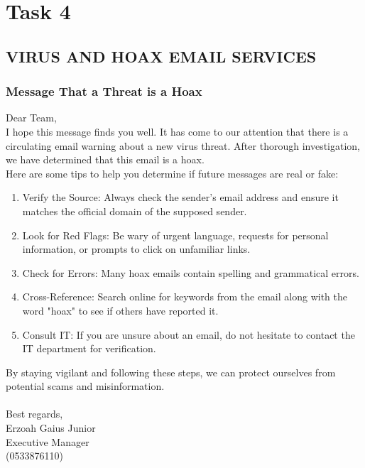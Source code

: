 \chapter*{ \centering Task 4}

\section*{VIRUS AND HOAX EMAIL SERVICES}
\subsection*{Message That a Threat is a Hoax}

Dear Team,\\

I hope this message finds you well. It has come to our attention that there is a circulating email warning about a new virus threat. After thorough investigation, we have determined that this email is a hoax. \\

Here are some tips to help you determine if future messages are real or fake:\vspace{.2cm}
\begin{enumerate}
	\item
	Verify the Source: Always check the sender's email address and ensure it matches the official domain of the supposed sender.
	\item
	Look for Red Flags: Be wary of urgent language, requests for personal information, or prompts to click on unfamiliar links.
	\item
	Check for Errors: Many hoax emails contain spelling and grammatical errors.
	\item
	Cross-Reference: Search online for keywords from the email along with the word "hoax" to see if others have reported it.
	\item
	Consult IT: If you are unsure about an email, do not hesitate to contact the IT department for verification.
\end{enumerate}
By staying vigilant and following these steps, we can protect ourselves from potential scams and misinformation. \\
\\
Best regards,\\
Erzoah Gaius Junior\\
Executive Manager\\
(0533876110)\\



